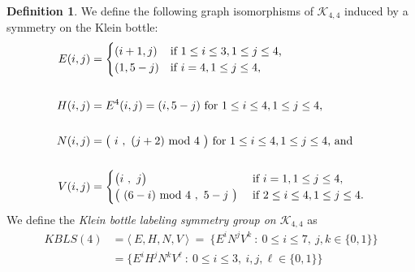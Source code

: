 \documentclass[10pt, reqno]{amsart}
\theoremstyle{definition}
\newtheorem{definition}{Definition}
\theoremstyle{plain}
\begin{document}
\begin{definition}\label{defn:KBSymmetries}
We define the following graph isomorphisms of $\mathcal{K}_{4,4}$ 
induced by a symmetry on the Klein bottle:
\begin{align}
  E(i,j)&=
  \begin{cases}
   (i+1,j) & \text{if $1\le i\le 3, 1\le j\le 4$,}\\
   (1,5-j) & \text{if $i=4, 1\le j\le 4$,}
  \end{cases}\label{te}\\
    &\notag\\
  H(i,j)&=E^4(i,j)=(i, 5-j)\ \text{for $1\le i\le 4, 1\le j\le 4$,}\ \label{th} \\
  &\notag\\
  N(i,j)&=\big(\ i\ ,\ (j+2)\ \text{mod}\ 4\  \big)\ \text{for $1\le i\le 4, 1\le j\le 4$, and}\label{tn}\\
  &\notag\\
  V(i,j)&=
   \begin{cases}
       \big(i\ ,\ j\big)\ & \text{if $i=1, 1\le j\le 4$,}\\
       \big(\ (6-i)\ \text{mod}\ 4\ , \ 5-j\  \big)\ & \text{if $2\le i\le 4, 1\le j\le 4$.}
   \end{cases}\label{tv}
\end{align}
We define the \textit{Klein bottle labeling symmetry 
group on $\mathcal{K}_{4,4}$} as 
\begin{equation}\label{kbls}
\begin{aligned}
\mathit{KBLS}(4)&=\langle\ E, H, N, V \ \rangle\ =\ \big\{ E^i N^j V^k \ : \ 0\le i\le 7, \ j,k\in\{0,1\} \big\}\\
&=\big\{ E^i H^j N^k V^{\ell} \ : \ 0\le i\le 3,\ i,j,\ell\in\{0,1\} \big\}
\end{aligned}
\end{equation}
\end{definition}
\end{document}
